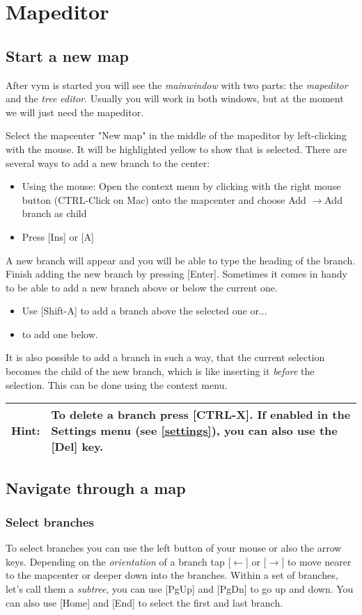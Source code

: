 \documentclass[12pt,a4paper]{article}
\newcommand{\hint}[1]{
    \begin{center} 
        \begin{tabular}{|rp{12cm}|} \hline
            {\bf Hint}:& #1\\   \hline
        \end{tabular}
            \marginpar{\Huge !} 
    \end{center} 
}
\newcommand{\vym}{{\sc vym }}
\newcommand{\ra}{$\longrightarrow$}
\newcommand{\la}{$\longleftarrow$}
\newcommand{\key}[1]{[#1]}
\begin{document}
\section{Mapeditor} \label {mapeditor}
\subsection{Start a new map}
After \vym is started you will see the {\em mainwindow} with two parts: the {\em mapeditor} and the
{\em tree editor}. Usually you will work in both windows, but at the
moment we will just need the mapeditor. 

Select the mapcenter "New map" in the middle of the mapeditor by
left-clicking with the mouse. It will be highlighted yellow to show that
is selected. There are several ways to add a new branch to the center:
\begin{itemize}
    \item Using the mouse: Open the context menu by clicking with the
    right mouse button (CTRL-Click on Mac) onto the
    mapcenter and choose Add \ra Add branch as child
    \item Press \key{Ins} or \key{A}
\end{itemize}
A new branch will appear and you will be able to type the heading of the
branch. Finish adding the new branch by pressing \key{Enter}.
Sometimes it comes in handy to be able to add a new branch above or
below the current one. 
\begin{itemize}
    \item Use \key{Shift-A} to add a branch above the selected one or... 
    \item \key{Ctrl-A} to add one below. 
\end{itemize}
It is also possible to add a branch in such a way, that the current
selection becomes the child of the new branch, which is like inserting
it {\em before} the selection. This can be done using the context menu.

\hint{To delete a branch press \key{CTRL-X}. If enabled in the Settings
menu (see \ref{settings}), you can also use the \key{Del} key.}

\subsection{Navigate through a map}
\subsubsection*{Select branches}
To select branches you can use the left button of your mouse or also the
arrow keys. Depending on the {\em orientation} of a branch tap \key{\la}
or \key{\ra} to move nearer to the mapcenter or deeper down into the
branches. Within a set of branches, let's call them a {\em subtree}, you
can use \key{PgUp} and \key{PgDn} to go up and down. You can also use
\key{Home} and \key{End} to select the first and last branch.
\end{document}
